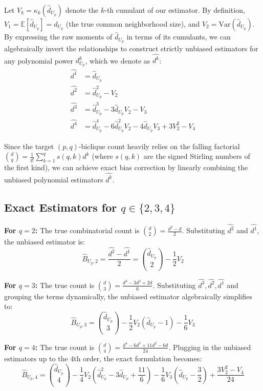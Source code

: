\documentclass[11pt,a4paper]{article}
\begin{document}
Let $V_k = \kappa_k(\hat{d}_{U_p})$ denote the $k$-th cumulant of our estimator. By definition, $V_1 = \mathbb{E}[\hat{d}_{U_p}] = d_{U_p}$ (the true common neighborhood size), and $V_2 = \text{Var}(\hat{d}_{U_p})$. By expressing the raw moments of $\hat{d}_{U_p}$ in terms of its cumulants, we can algebraically invert the relationships to construct strictly unbiased estimators for any polynomial power $d_{U_p}^k$, which we denote as $\widehat{d^k}$:
\begin{align}
    \widehat{d^1} &= \hat{d}_{U_p} \\
    \widehat{d^2} &= \hat{d}_{U_p}^2 - V_2 \\
    \widehat{d^3} &= \hat{d}_{U_p}^3 - 3\hat{d}_{U_p}V_2 - V_3 \\
    \widehat{d^4} &= \hat{d}_{U_p}^4 - 6\hat{d}_{U_p}^2V_2 - 4\hat{d}_{U_p}V_3 + 3V_2^2 - V_4
\end{align}

Since the target $(p,q)$-biclique count heavily relies on the falling factorial $\binom{d}{q} = \frac{1}{q!} \sum_{k=1}^q s(q, k) d^k$ (where $s(q, k)$ are the signed Stirling numbers of the first kind), we can achieve exact bias correction by linearly combining the unbiased polynomial estimators $\widehat{d^k}$.

\subsection{Exact Estimators for $q \in \{2, 3, 4\}$}

\textbf{For $q=2$:} The true combinatorial count is $\binom{d}{2} = \frac{d^2 - d}{2}$. Substituting $\widehat{d^2}$ and $\widehat{d^1}$, the unbiased estimator is:
\begin{equation}
    \hat{B}_{U_p, 2} = \frac{\widehat{d^2} - \widehat{d^1}}{2} = \binom{\hat{d}_{U_p}}{2} - \frac{1}{2}V_2
\end{equation}

\textbf{For $q=3$:} The true count is $\binom{d}{3} = \frac{d^3 - 3d^2 + 2d}{6}$. Substituting $\widehat{d^3}, \widehat{d^2}, \widehat{d^1}$ and grouping the terms dynamically, the unbiased estimator algebraically simplifies to:
\begin{equation}
    \hat{B}_{U_p, 3} = \binom{\hat{d}_{U_p}}{3} - \frac{1}{2}V_2 (\hat{d}_{U_p} - 1) - \frac{1}{6}V_3
\end{equation}

\textbf{For $q=4$:} The true count is $\binom{d}{4} = \frac{d^4 - 6d^3 + 11d^2 - 6d}{24}$. Plugging in the unbiased estimators up to the 4th order, the exact formulation becomes:
\begin{equation}
    \hat{B}_{U_p, 4} = \binom{\hat{d}_{U_p}}{4} - \frac{1}{4}V_2\left(\hat{d}_{U_p}^2 - 3\hat{d}_{U_p} + \frac{11}{6}\right) - \frac{1}{6}V_3\left(\hat{d}_{U_p} - \frac{3}{2}\right) + \frac{3V_2^2 - V_4}{24}
\end{equation}
\end{document}
